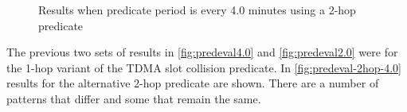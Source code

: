 \begin{figure}[H]
\centering
{}

\caption{Results when predicate period is every 4.0 minutes using a 2-hop predicate}
\label{fig:predeval-2hop-4.0}
\end{figure}

The previous two sets of results in \autoref{fig:predeval4.0} and \autoref{fig:predeval2.0} were for the 1-hop variant of the TDMA slot collision predicate. In \autoref{fig:predeval-2hop-4.0} results for the alternative 2-hop predicate are shown. There are a number of patterns that differ and some that remain the same.

